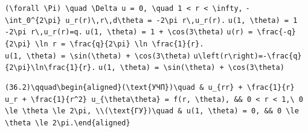 \documentclass[
  ukrainian,
]{article}
\begin{document}
\texttt{(\textbackslash{}forall\ \textbackslash{}Pi)\ \textbackslash{}quad\ \textbackslash{}Delta\ u\ =\ 0,\ \textbackslash{}quad\ 1\ \textless{}\ r\ \textless{}\ \textbackslash{}infty,}
\texttt{-\textbackslash{}int\_0\^{}\{2\textbackslash{}pi\}\ u\_r(r)\textbackslash{},r\textbackslash{},d\textbackslash{}theta\ =\ -2\textbackslash{}pi\ r\textbackslash{},u\_r(r).}
\texttt{u(1,\ \textbackslash{}theta)\ =\ 1}
\texttt{-2\textbackslash{}pi\ r\textbackslash{},u\_r(r)=q.}
\texttt{u(1,\ \textbackslash{}theta)\ =\ 1\ +\ \textbackslash{}cos(3\textbackslash{}theta)}
\texttt{u(r)\ =\ \textbackslash{}frac\{-q\}\{2\textbackslash{}pi\}\ \textbackslash{}ln\ r\ =\ \textbackslash{}frac\{q\}\{2\textbackslash{}pi\}\ \textbackslash{}ln\ \textbackslash{}frac\{1\}\{r\}.}
\texttt{u(1,\ \textbackslash{}theta)\ =\ \textbackslash{}sin(\textbackslash{}theta)\ +\ \textbackslash{}cos(3\textbackslash{}theta)}
\texttt{u\textbackslash{}left(r\textbackslash{}right)=-\textbackslash{}frac\{q\}\{2\textbackslash{}pi\}\textbackslash{}ln\textbackslash{}frac\{1\}\{r\}.}
\texttt{u(1,\ \textbackslash{}theta)\ =\ \textbackslash{}sin(\textbackslash{}theta)\ +\ \textbackslash{}cos(3\textbackslash{}theta)}

\begin{verbatim}
(36.2)\qquad\begin{aligned}(\text{УЧП})\quad & u_{rr} + \frac{1}{r} u_r + \frac{1}{r^2} u_{\theta\theta} = f(r, \theta), && 0 < r < 1,\ 0 \le \theta \le 2\pi, \\(\text{ГУ})\quad & u(1, \theta) = 0, && 0 \le \theta \le 2\pi.\end{aligned}
\end{verbatim}
\end{document}

